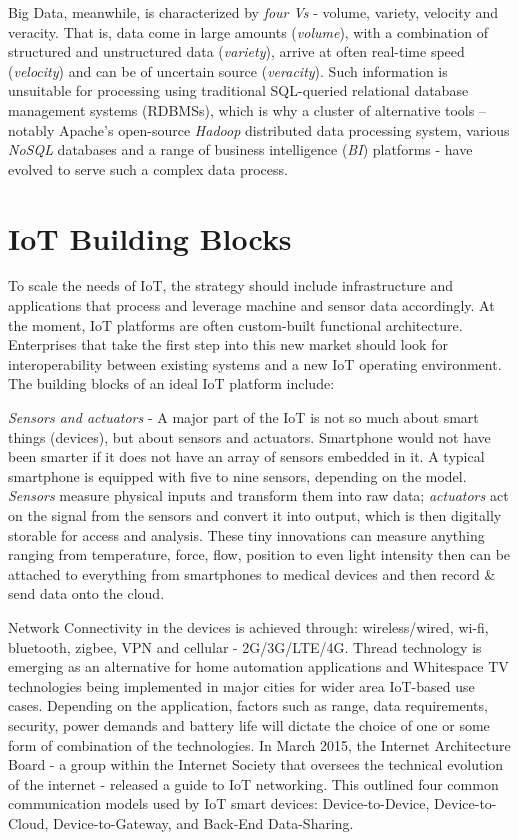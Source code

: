 \documentclass[sigconf]{acmart}
\begin{document}
Big Data, meanwhile, is characterized by {\em four Vs} - volume, variety, velocity and veracity\cite{3_wiki_bigdata}. That is, data come in large amounts ({\em volume}), with a combination of structured and unstructured data ({\em variety}), arrive at often real-time speed ({\em velocity}) and can be of uncertain source ({\em veracity}). Such information is unsuitable for processing using traditional SQL-queried relational database management systems (RDBMSs), which is why a cluster of alternative tools -- notably Apache's open-source {\em Hadoop} distributed data processing system, various {\em NoSQL} databases and a range of business intelligence ({\em BI}) platforms - have evolved to serve such a complex data process.


\section{IoT Building Blocks}

To scale the needs of IoT, the strategy should include infrastructure and applications that process and leverage machine and sensor data accordingly. At the moment, IoT platforms are often custom-built functional architecture. Enterprises that take the first step into this new market should look for interoperability between existing systems and a new IoT operating environment. The building blocks of an ideal IoT platform include:

{\em Sensors and actuators} -  A major part of the IoT is not so much about smart things (devices), but about sensors and actuators. Smartphone would not have been smarter if it does not have an array of sensors embedded in it. A typical smartphone is equipped with five to nine sensors, depending on the model. {\em Sensors} measure physical inputs and transform them into raw data; {\em actuators} act on the signal from the sensors and convert it into output, which is then digitally storable for access and analysis.  These tiny innovations can measure anything ranging from temperature, force, flow, position to even light intensity then can be attached to everything from smartphones to medical devices and then record \& send data onto the cloud\cite{4_Wiley_Book}. 

Network Connectivity in the devices is achieved through: wireless/wired, wi-fi, bluetooth, zigbee, VPN and cellular - 2G/3G/LTE/4G. Thread technology is emerging as an alternative for home automation applications and Whitespace TV technologies being implemented in major cities for wider area IoT-based use cases. Depending on the application, factors such as range, data requirements, security, power demands and battery life will dictate the choice of one or some form of combination of the technologies. In March 2015, the Internet Architecture Board - a group within the Internet Society that oversees the technical evolution of the internet - released a guide to IoT networking. This outlined four common communication models used by IoT smart devices: Device-to-Device, Device-to-Cloud, Device-to-Gateway, and Back-End Data-Sharing\cite{5_Internet_Society}.
\end{document}

